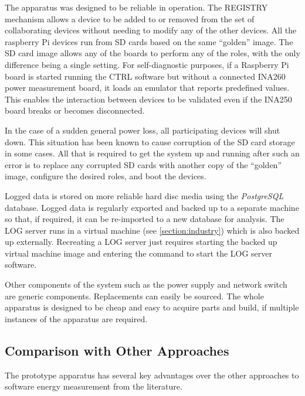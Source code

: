 The apparatus was designed to be reliable in operation. The REGISTRY mechanism allows a device to be added to or removed from the set of collaborating devices without needing to modify any of the other devices. All the raspberry Pi devices run from SD cards based on the same \enquote{golden} image. The SD card image allows any of the boards to perform any of the roles, with the only difference being a single setting. For self-diagnostic purposes, if a Raspberry Pi board is started running the CTRL software but without a connected INA260 power measurement board, it loads an emulator that reports predefined values. This enables the interaction between devices to be validated even if the INA250 board breaks or becomes disconnected.

In the case of a sudden general power loss, all participating devices will shut down. This situation has been known to cause corruption of the SD card storage in some cases. All that is required to get the system up and running after such an error is to replace any corrupted SD cards with another copy of the \enquote{golden} image, configure the desired roles, and boot the devices.

Logged data is stored on more reliable hard disc media using the \emph{PostgreSQL} database. Logged data is regularly exported and backed up to a separate machine so that, if required, it can be re-imported to a new database for analysis. The LOG server runs in a virtual machine (see \autoref{section:industry}) which is also backed up externally. Recreating a LOG server just requires starting the backed up virtual machine image and entering the command to start the LOG server software.

Other components of the system such as the power supply and network switch are generic components. Replacements can easily be sourced. The whole apparatus is designed to be cheap and easy to acquire parts and build, if multiple instances of the apparatus are required.

\subsection{Comparison with Other Approaches}

The prototype apparatus has several key advantages over the other approaches to software energy measurement from the literature.

